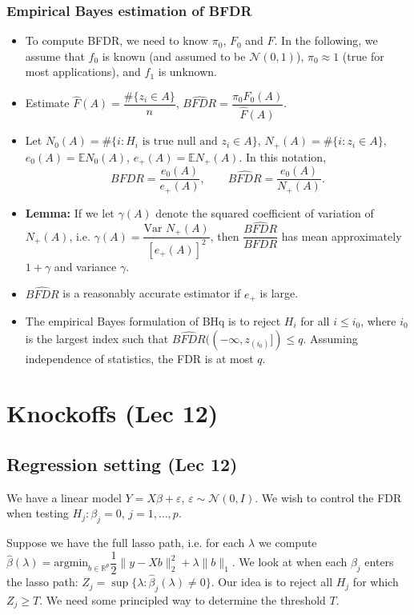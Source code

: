 \documentclass[twoside]{article}
\newcommand\bbE{\mathbb{E}}
\newcommand\bbR{\mathbb{R}}
\newcommand\calN{\mathcal{N}}
\def\eps{\varepsilon}
\newcommand\lmb{\lambda}
\newcommand\var{\text{Var }}
\begin{document}
\subsubsection{Empirical Bayes estimation of BFDR}
\begin{itemize}
\item To compute BFDR, we need to know $\pi_0$, $F_0$ and $F$. In the following, we assume that $f_0$ is known (and assumed to be $\calN(0,1)$), $\pi_0 \approx 1$ (true for most applications), and $f_1$ is unknown.

\item Estimate $\widehat{F}(A) = \dfrac{\# \{ z_i \in A\}}{n}$, $\widehat{BFDR} = \dfrac{\pi_0 F_0(A)}{\widehat{F}(A)}$.

\item Let $N_0(A) = \#\{i: H_i \text{ is true null and } z_i \in A \}$, $N_+(A) = \# \{ i: z_i \in A\}$, $e_0(A) = \bbE N_0(A)$, $e_+(A) = \bbE N_+(A)$. In this notation,
\[ BFDR = \frac{e_0(A)}{e_+(A)}, \qquad \widehat{BFDR} = \frac{e_0(A)}{N_+(A)}. \]

\item \textbf{Lemma:} If we let $\gamma(A)$ denote the squared coefficient of variation of $N_+(A)$, i.e. $\gamma(A) = \dfrac{\var N_+(A)}{[e_+(A)]^2}$, then $\dfrac{\widehat{BFDR}}{BFDR}$ has mean approximately $1 + \gamma$ and variance $\gamma$.

\item $\widehat{BFDR}$ is a reasonably accurate estimator if $e_+$ is large.

\item The empirical Bayes formulation of BHq is to reject $H_i$ for all $i \leq i_0$, where $i_0$ is the largest index such that $\widehat{BFDR}((-\infty, z_{(i_0)}]) \leq q$. Assuming independence of statistics, the FDR is at most $q$.

\end{itemize}

\section{Knockoffs (Lec 12)}
\subsection{Regression setting (Lec 12)}
We have a linear model $Y = X\beta + \eps$, $\eps \sim \calN(0, I)$. We wish to control the FDR when testing $H_j: \beta_j = 0$, $j = 1, \dots, p$.

Suppose we have the full lasso path, i.e. for each $\lmb$ we compute $\hat{\beta}(\lmb) = \text{argmin}_{b \in \bbR^p} \dfrac{1}{2}\|y - Xb \|_2^2 + \lmb \|b\|_1$. We look at when each $\beta_j$ enters the lasso path: $Z_j = \sup \{ \lmb: \hat{\beta}_j(\lmb) \neq 0 \}$. Our idea is to reject all $H_j$ for which $Z_j \geq T$. We need some principled way to determine the threshold $T$.
\end{document}
